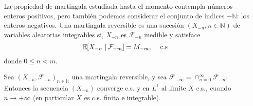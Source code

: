 La propiedad de martingala estudiada hasta el momento contempla números enteros positivos, pero también podemos considerar el conjunto de índices $-\mathbb{N}$: los enteros negativos. Una martingala reversible es una sucesión $(X_{-n}, n \in \mathbb{N})$ de variables aleatorias integrables si, $X_{-n}$ es $\mathcal{F}_{-n}$ medible y satisface
	\begin{align}
	\mathbb{E}[X_{-n} \mid \mathcal{F}_{-m}] = M_{-m}, \hspace{0.3cm} \text{ c.s } \label{aav}
	\end{align}
donde $0 \leq n < m$.

\begin{theorem}
\label{conver2}
Sea $(X_{-n}, \mathcal{F}_{-n})_{n \in \mathbb{N}}$ una martingala reversible, y sea $\mathcal{F}_{-\infty} = \cap_{n = 0}^{\infty} \mathcal{F}_{-n}$. Entonces la secuencia $(X_{-n})$ converge c.s. y en $L^1$ al límite $X$ c.s., cuando $n \rightarrow +\infty$ (en particular $X$ es c.s. finita e integrable).
\end{theorem}
